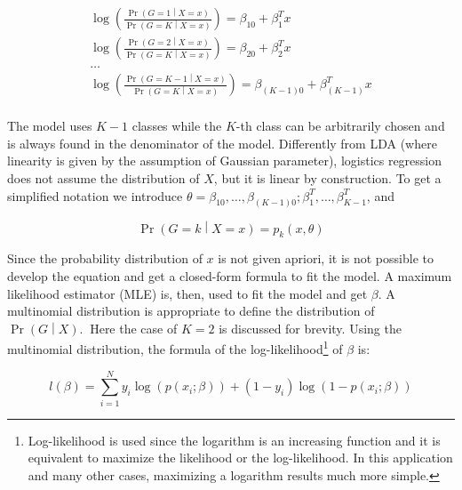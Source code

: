 \begin{equation}
\begin{split}
    \log{\left(\frac{\Pr{\left(G=1\middle| X=x\right)}}{\Pr{\left(G=K\middle| X=x\right)}}\right)=\beta_{10}+\beta_1^Tx} \\
    \log{\left(\frac{\Pr{\left(G=2\middle| X=x\right)}}{\Pr{\left(G=K\middle| X=x\right)}}\right)=\beta_{20}+\beta_2^Tx} \\
    \ldots \\
    \log{\left(\frac{\Pr{\left(G=K-1\middle| X=x\right)}}{\Pr{\left(G=K\middle| X=x\right)}}\right)=\beta_{(K-1)0}+\beta_{(K-1)}^Tx} \\
\end{split}
\label{eq_LogisticRegression1}
\end{equation}

The model uses $K-1$ classes while the $K$-th class can be arbitrarily chosen and is always found in the denominator of the model. Differently from LDA (where linearity is given by the assumption of Gaussian parameter), logistics regression does not assume the distribution of $X$, but it is linear by construction. To get a simplified notation we introduce $\theta={\beta_{10},\ldots{,\beta}_{\left(K-1\right)0};\beta_1^T,\ldots,\beta_{K-1}^T}$, and

\begin{equation}
    \Pr{\left(G=k\middle| X=x\right)}=p_k(x,\theta)
    \label{eq_LogisticRegression2}
\end{equation}

Since the probability distribution of $x$ is not given apriori, it is not possible to develop the equation and get a closed-form formula to fit the model. A maximum likelihood estimator (MLE) is, then, used to fit the model and get $\beta$. A multinomial distribution is appropriate to define the distribution of $\Pr{\left(G\middle| X\right).\ }$ Here the case of  $K=2$ is discussed for brevity. Using the multinomial distribution, the formula of the log-likelihood\footnote{Log-likelihood is used since the logarithm is an increasing function and it is equivalent to maximize the likelihood or the log-likelihood. In this application and many other cases, maximizing a logarithm results much more simple.} of $\beta$ is:

\begin{equation}
    l\left(\beta\right)=\sum_{i=1}^{N}{{y_i\log{\left(p\left(x_i;\beta\right)\right)}+\left(1-y_i\right)\log{\left(1-p\left(x_i;\beta\right)\right)}}}
    \label{eq_LogisticRegression3}
\end{equation}

